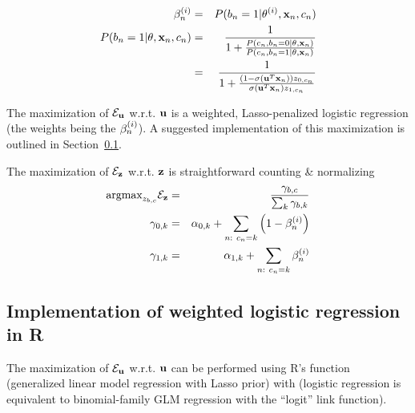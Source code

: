 \documentclass{article}
\begin{document}
\begin{eqnarray*}
  \\
  \beta^{(i )}_{n}
  & = &
  P(b_{n} = 1 | \theta^{(i)}, {\bf x}_{n}, c_{n})
  \\
  P(b_{n} = 1 | \theta, {\bf x}_{n}, c_{n})
  & = &
  \frac{1}{1 + \frac{P(c_{n}, b_{n} = 0 | \theta, {\bf x}_{n})}
    {P(c_{n}, b_{n} = 1 | \theta, {\bf x}_{n})}}
  \\
  & = &
  \frac{1}{1 + \frac{(1 - \sigma\left({\bf u}^T {\bf x}_{n}\right)) z_{0,c_{n}}}
    {\sigma\left({\bf u}^T {\bf x}_{n}\right) z_{1,c_{n}}}}
\end{eqnarray*}

The maximization of ${\cal E}_{{\bf u}}$ w.r.t. ${\bf u}$ is a weighted, Lasso-penalized logistic regression
(the weights being the $\beta^{(i )}_{n}$).
A suggested implementation of this maximization is outlined in Section~\ref{sec:WeightedLogisticRegression}.

The maximization of ${\cal E}_{{\bf z}}$ w.r.t. ${\bf z}$ is straightforward counting \& normalizing
\begin{eqnarray*}
  \argmax_{\labelerrprob_{\binlabel,\catlabel}} \emobjective_{\labelerrprobs} & = & \frac{\labelerrsum_{\binlabel,\catlabel}}{\sum_{\catlabelindex} \labelerrsum_{\binlabel,\catlabelindex} } \\
  \labelerrsum_{0,\catlabelindex} & = & \pseudocount_{0,\catlabelindex} + \sum_{\datapoint:\ \catlabel_{\datapoint} = \catlabelindex} \left( 1 - \postprob \right) \\
  \labelerrsum_{1,\catlabelindex} & = & \pseudocount_{1,\catlabelindex} + \sum_{\datapoint:\ \catlabel_{\datapoint} = \catlabelindex} \postprob
\end{eqnarray*}

\subsection{Implementation of weighted logistic regression in R}
\label{sec:WeightedLogisticRegression}

The maximization of ${\cal E}_{{\bf u}}$ w.r.t. ${\bf u}$ can be performed using R's  function (generalized linear model regression with Lasso prior)
with 
(logistic regression is equivalent to binomial-family GLM regression with the ``logit'' link function).
\end{document}
